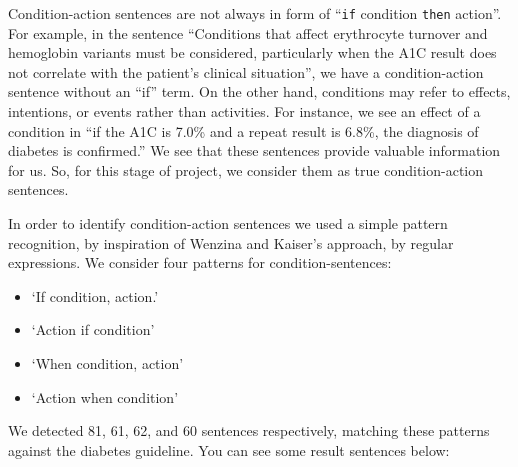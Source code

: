 \documentclass[12pt,letterpaper]{article}
\begin{document}
Condition-action sentences are not always in form of ``\texttt{if} condition \texttt{then} action''. For example, in the sentence ``Conditions that affect erythrocyte turnover and hemoglobin variants must be considered, particularly when the A1C result does not correlate with the patient's clinical situation'', we have a condition-action sentence without an ``if'' term. On the other hand, conditions may refer to effects, intentions, or events rather than activities. For instance, we see an effect of a condition in ``if the A1C is 7.0\% and a repeat result is 6.8\%, the diagnosis of diabetes is confirmed.'' We see that these sentences provide valuable information for us. So, for this stage of project, we consider them as true condition-action sentences. 

In order to identify condition-action sentences we used a simple pattern recognition, by inspiration of Wenzina and Kaiser's approach\cite{wenzina2013identifying},  by regular expressions. We consider four patterns for condition-sentences: 
\begin{itemize}
	\item `If condition, action.'
	\item `Action if condition'
	\item `When condition, action'
	\item `Action when condition'
\end{itemize}
We detected 81, 61, 62, and 60 sentences respectively, matching these patterns against the diabetes guideline. You can see some result sentences below:
\end{document}
